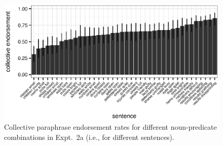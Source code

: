 \documentclass[preprint,12pt,authoryear,titlepage]{elsarticle}
\begin{document}
\begin{figure}[h!]
	\centering
	\includegraphics[width=1.04\linewidth]{plots/sentence_plot.eps}
	\vspace{-20pt}
	\caption{Collective paraphrase endorsement rates for different noun-predicate combinations in Expt.~2a (i.e., for different sentences).} \label{sentence-coll}
\end{figure}
\end{document}
